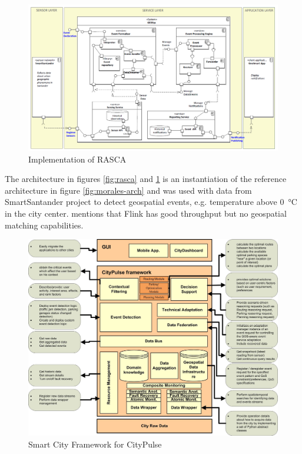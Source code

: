 \documentclass[parskip=half]{scrartcl}
\begin{document}
\begin{figure}
	\centering
	\includegraphics[width=\textwidth]{Garcia_2019b}
	\caption{Implementation of RASCA~\cite[p.~13]{GarciaAlvarez.2019}}
	\label{fig:rasca-impl}
\end{figure}

The architecture in figures \ref{fig:rasca} and \ref{fig:rasca-impl} is an instantiation of the reference architecture in figure \ref{fig:morales-arch} and was used with data from SmartSantander project to detect geospatial events, e.g. temperature above \SI{0}{\celsius} in the city center. \cite{GarciaAlvarez.2019} mentions that Flink has good throughput but no geospatial matching capabilities. 

\begin{figure}
	\centering
	\includegraphics[width=\textwidth]{Tsiatsis_2015b}
	\caption{Smart City Framework for CityPulse~\cite[p.~39]{Tsiatsis.2015}}
	\label{fig:citypulse-framework}
\end{figure}
\end{document}
